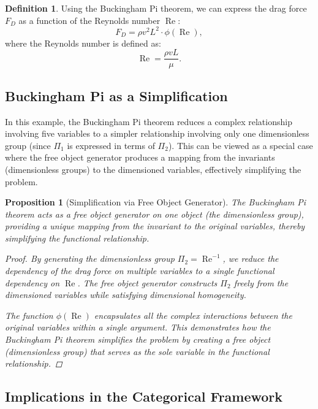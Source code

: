 \documentclass{article}
\newtheorem{proposition}{Proposition}[section]
\theoremstyle{definition}
\newtheorem{definition}{Definition}[section]
\theoremstyle{remark}
\begin{document}
	\begin{definition}
		Using the Buckingham Pi theorem, we can express the drag force $F_D$ as a function of the Reynolds number $\operatorname{Re}$:
		\[
		F_D = \rho v^2 L^2 \cdot \phi(\operatorname{Re}),
		\]
		where the Reynolds number is defined as:
		\[
		\operatorname{Re} = \dfrac{\rho v L}{\mu}.
		\]
		
	\end{definition}
	
	\subsection{Buckingham Pi as a Simplification}
	
	In this example, the Buckingham Pi theorem reduces a complex relationship involving five variables to a simpler relationship involving only one dimensionless group (since $\Pi_1$ is expressed in terms of $\Pi_2$). This can be viewed as a special case where the free object generator produces a mapping from the invariants (dimensionless groups) to the dimensioned variables, effectively simplifying the problem.
	
	\begin{proposition}[Simplification via Free Object Generator]
		The Buckingham Pi theorem acts as a free object generator on one object (the dimensionless group), providing a unique mapping from the invariant to the original variables, thereby simplifying the functional relationship.
		
		\begin{proof}
			By generating the dimensionless group $\Pi_2 = \operatorname{Re}^{-1}$, we reduce the dependency of the drag force on multiple variables to a single functional dependency on $\operatorname{Re}$. The free object generator constructs $\Pi_2$ freely from the dimensioned variables while satisfying dimensional homogeneity.
			
			The function $\phi(\operatorname{Re})$ encapsulates all the complex interactions between the original variables within a single argument. This demonstrates how the Buckingham Pi theorem simplifies the problem by creating a free object (dimensionless group) that serves as the sole variable in the functional relationship.
		\end{proof}
	\end{proposition}
	
	\subsection{Implications in the Categorical Framework}
	
\end{document}
